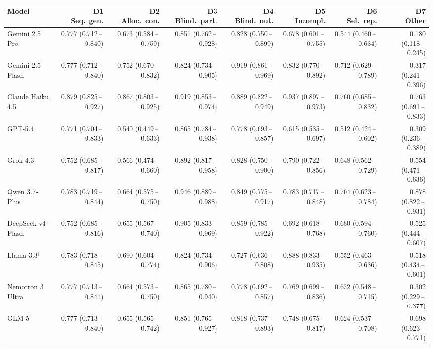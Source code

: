 \begin{tabular}{lrrrrrrr}
\toprule
Model & \makecell{D1\\Seq.\ gen.} & \makecell{D2\\Alloc.\ con.} & \makecell{D3\\Blind.\ part.} & \makecell{D4\\Blind.\ out.} & \makecell{D5\\Incompl.} & \makecell{D6\\Sel.\ rep.} & \makecell{D7\\Other} \\
\midrule
Gemini 2.5 Pro & 0.777 (0.712\,--\,0.840) & 0.673 (0.584\,--\,0.759) & 0.851 (0.762\,--\,0.928) & 0.828 (0.750\,--\,0.899) & 0.678 (0.601\,--\,0.755) & 0.544 (0.460\,--\,0.634) & 0.180 (0.118\,--\,0.245) \\
Gemini 2.5 Flash & 0.777 (0.712\,--\,0.840) & 0.752 (0.670\,--\,0.832) & 0.824 (0.734\,--\,0.905) & 0.919 (0.861\,--\,0.969) & 0.832 (0.770\,--\,0.892) & 0.712 (0.629\,--\,0.789) & 0.317 (0.241\,--\,0.396) \\
Claude Haiku 4.5 & 0.879 (0.825\,--\,0.927) & 0.867 (0.803\,--\,0.925) & 0.919 (0.853\,--\,0.974) & 0.889 (0.822\,--\,0.949) & 0.937 (0.897\,--\,0.973) & 0.760 (0.685\,--\,0.832) & 0.763 (0.691\,--\,0.833) \\
GPT-5.4 & 0.771 (0.704\,--\,0.833) & 0.540 (0.449\,--\,0.633) & 0.865 (0.784\,--\,0.938) & 0.778 (0.693\,--\,0.857) & 0.615 (0.535\,--\,0.697) & 0.512 (0.424\,--\,0.602) & 0.309 (0.236\,--\,0.389) \\
Grok 4.3 & 0.752 (0.685\,--\,0.817) & 0.566 (0.474\,--\,0.660) & 0.892 (0.817\,--\,0.958) & 0.828 (0.750\,--\,0.900) & 0.790 (0.722\,--\,0.856) & 0.648 (0.562\,--\,0.729) & 0.554 (0.471\,--\,0.636) \\
Qwen 3.7-Plus & 0.783 (0.719\,--\,0.844) & 0.664 (0.575\,--\,0.750) & 0.946 (0.889\,--\,0.988) & 0.849 (0.775\,--\,0.917) & 0.783 (0.717\,--\,0.848) & 0.704 (0.623\,--\,0.784) & 0.878 (0.822\,--\,0.931) \\
DeepSeek v4-Flash & 0.752 (0.685\,--\,0.816) & 0.655 (0.567\,--\,0.740) & 0.905 (0.833\,--\,0.969) & 0.859 (0.785\,--\,0.922) & 0.692 (0.618\,--\,0.768) & 0.680 (0.594\,--\,0.760) & 0.525 (0.444\,--\,0.607) \\
Llama 3.3$^\dagger$ & 0.783 (0.718\,--\,0.845) & 0.690 (0.604\,--\,0.774) & 0.824 (0.734\,--\,0.906) & 0.727 (0.636\,--\,0.808) & 0.888 (0.833\,--\,0.935) & 0.552 (0.463\,--\,0.636) & 0.518 (0.434\,--\,0.601) \\
Nemotron 3 Ultra & 0.777 (0.713\,--\,0.841) & 0.664 (0.573\,--\,0.750) & 0.865 (0.780\,--\,0.940) & 0.778 (0.692\,--\,0.857) & 0.769 (0.699\,--\,0.836) & 0.632 (0.548\,--\,0.715) & 0.302 (0.229\,--\,0.377) \\
GLM-5 & 0.777 (0.713\,--\,0.840) & 0.655 (0.565\,--\,0.742) & 0.851 (0.765\,--\,0.927) & 0.818 (0.737\,--\,0.893) & 0.748 (0.675\,--\,0.817) & 0.624 (0.537\,--\,0.708) & 0.698 (0.623\,--\,0.771) \\
\bottomrule
\end{tabular}